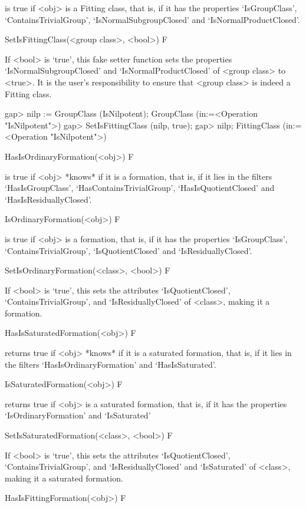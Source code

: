 is true if <obj> is a Fitting class, that is, if it has the properties
`IsGroupClass', `ContainsTrivialGroup', `IsNormalSubgroupClosed' and
`IsNormalProductClosed'.

\>SetIsFittingClass(<group class>, <bool>) F

If <bool> is `true', this fake setter function sets the properties
`IsNormalSubgroupClosed' and `IsNormalProductClosed' of <group class> to
<true>. It is the user's responsibility  to ensure that <group class> is
indeed a Fitting class.

\beginexample
gap> nilp := GroupClass (IsNilpotent);
GroupClass (in:=<Operation "IsNilpotent">)
gap> SetIsFittingClass (nilp, true);
gap> nilp;
FittingClass (in:=<Operation "IsNilpotent">)
\endexample

\>HasIsOrdinaryFormation(<obj>) F

%
is true if <obj> *knows* if it is a formation, that is, if it lies in the filters
`HasIsGroupClass', `HasContainsTrivialGroup', `HasIsQuotientClosed' and 
`HasIsResiduallyClosed'.

\>IsOrdinaryFormation(<obj>) F

%
is true if <obj> is a formation, that is, if it has the properties
`IsGroupClass', `ContainsTrivialGroup', `IsQuotientClosed' and `IsResiduallyClosed'.

\>SetIsOrdinaryFormation(<class>, <bool>) F

%
If <bool> is `true', this sets the attributes `IsQuotientClosed',
`ContainsTrivialGroup', and `IsResiduallyClosed' of <class>, making it a formation.

\>HasIsSaturatedFormation(<obj>) F

returns true if <obj> *knows* if it is a saturated formation, that is, if it
lies in the filters `HasIsOrdinaryFormation' and `HasIsSaturated'.

\>IsSaturatedFormation(<obj>) F

returns true if <obj> is a saturated formation, that is, if it has the
properties `IsOrdinaryFormation' and `IsSaturated'

\>SetIsSaturatedFormation(<class>, <bool>) F

If <bool> is `true', this sets the attributes `IsQuotientClosed',
`ContainsTrivialGroup', and `IsResiduallyClosed' and `IsSaturated'
of <class>, making it a saturated formation.

\>HasIsFittingFormation(<obj>) F

